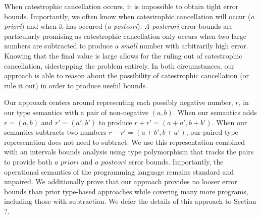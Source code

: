 When catestrophic cancellation occurs, it is impossible to obtain tight error
bounds. Importantly, we often know when catestrophic cancellation will occur
(\textit{a priori}) and when it has occured (\textit{a posteori}). \textit{A
posterori} error bounds are particularly promising as catestrophic cancellation
only occurs when two large numbers are subtracted to produce a \textit{small}
number with arbitrarily high error. Knowing that the final value is large allows
for the ruling out of catestrophic cancellation, sidestepping the problem
entirely.
In both circumstances, our approach is able to reason about the possibility of
catestrophic cancellation (or rule it out) in order to produce useful bounds.

Our approach centers around representing each possibly negative number, $r$, in
our type semantics with a pair of non-negative $(a, b)$. When our semantics adds
$r = (a, b)$ and $r' = (a', b')$ to produce $r + r' = (a + a', b + b')$. When
our semantics subtracts two numbers $r - r' = (a + b', b + a')$, our paired type
represenation does not need to subtract. We use this representation combined
with an intervals bounds analysis using type polymorphism that tracks the pairs
to provide both $\textit{a priori}$ and $\textit{a posteori}$ error bounds.
Importantly, the operational semantics of the programming language remains
standard and unpaired. We additionally prove that our approach provides no
looser error bounds than prior type-based approaches while covering many more
programs, including those with subtraction. We defer the details of this
approach to Section ?. %

